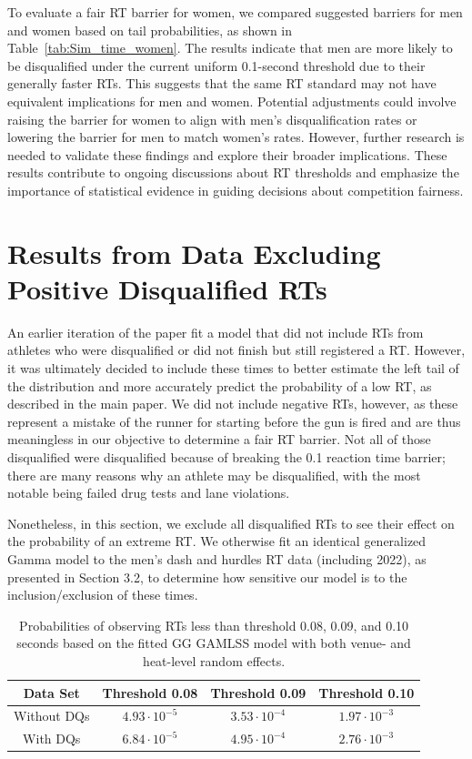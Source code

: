 \documentclass[12pt, letterpaper]{article}
\begin{document}
To evaluate a fair RT barrier for women, we compared suggested 
barriers for men and women based on tail probabilities, as shown in 
Table~\ref{tab:Sim_time_women}. The results indicate that men are more likely 
to be disqualified under the current uniform 0.1-second threshold due to their 
generally faster RTs. This suggests that the same RT standard may not 
have equivalent implications for men and women. Potential adjustments could 
involve raising the barrier for women to align with men’s disqualification rates 
or lowering the barrier for men to match women’s rates. However, further research 
is needed to validate these findings and explore their broader implications. These 
results contribute to ongoing discussions about RT thresholds and emphasize the 
importance of statistical evidence in guiding decisions about competition fairness.


\section{Results from Data Excluding Positive Disqualified RTs}

An earlier iteration of the paper fit a model that did not include RTs from
athletes who were disqualified or did not finish but still registered a RT.  
However, it was ultimately decided to include these times to better estimate the 
left tail of the distribution and more accurately predict the probability of a 
low RT, as described in the main paper. 
We did not include negative RTs, however, as these represent a mistake of the
runner for starting before the gun is fired and are thus meaningless in our
objective to determine a fair RT barrier.  Not all of those disqualified were
disqualified because of breaking the 0.1 reaction time barrier; there are many
reasons why an athlete may be disqualified, with the most notable being failed
drug tests and lane violations.  

Nonetheless, in this section,
we exclude all disqualified RTs to see their effect on the probability of an
extreme RT. We otherwise fit an identical generalized Gamma model to the men's 
dash and hurdles RT data (including 2022), as presented in Section 3.2,
to determine how sensitive our model is to the inclusion/exclusion of these times.


\begin{table}
  \centering
   \caption{Probabilities of observing RTs less than threshold 0.08,
   0.09, and 0.10 seconds based on the
     fitted GG GAMLSS model with both venue- and heat-level
 random effects.}
   \begin{tabular}{c c c c}
    \toprule
    Data Set & Threshold 0.08 & Threshold 0.09 & Threshold 0.10  \\
    \midrule
    Without DQs & $4.93\cdot10^{-5}$ & $3.53\cdot10^{-4}$ &  $1.97\cdot10^{-3}$  \\
    With DQs & $6.84\cdot10^{-5}$ & $4.95\cdot10^{-4}$ & $2.76\cdot10^{-3}$ \\
    \bottomrule
   \end{tabular}
   \label{tab:DQSim_probability}
 \end{table}
\end{document}
